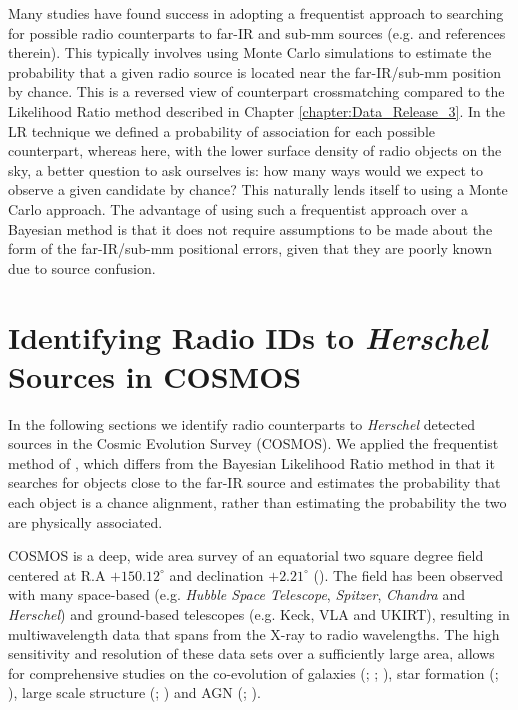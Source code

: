 Many studies have found success in adopting a frequentist approach to searching for possible radio counterparts to far-IR and sub-mm sources (e.g. \citealt{Eales_2009, Dye_2009, Dunlop_2010} and references therein). This typically involves using Monte Carlo simulations to estimate the probability that a given radio source is located near the far-IR/sub-mm position by chance. This is a reversed view of counterpart crossmatching compared to the Likelihood Ratio method described in Chapter \ref{chapter:Data_Release_3}. In the LR technique we defined a probability of association for each possible counterpart, whereas here, with the lower surface density of radio objects on the sky, a better question to ask ourselves is: how many ways would we expect to observe a given candidate by chance? This naturally lends itself to using a Monte Carlo approach. The advantage of using such a frequentist approach over a Bayesian method is that it does not require assumptions to be made about the form of the far-IR/sub-mm positional errors, given that they are poorly known due to source confusion.

\section{Identifying Radio IDs to \textit{Herschel} Sources in COSMOS}

In the following sections we identify radio counterparts to \textit{Herschel} detected sources in the Cosmic Evolution Survey (COSMOS). We applied the frequentist method of \citealt{Lilly_1999}, which differs from the Bayesian Likelihood Ratio method in that it searches for objects close to the far-IR source and estimates the probability that each object is a chance alignment, rather than estimating the probability the two are physically associated.

COSMOS is a deep, wide area survey of an equatorial two square degree field centered at R.A $+150.12^{\circ}$ and declination $+2.21^{\circ}$ (\citealt{Scoville_2007}). The field has been observed with many space-based (e.g. \textit{Hubble Space Telescope}, \textit{Spitzer}, \textit{Chandra} and \textit{Herschel}) and ground-based telescopes (e.g. Keck, VLA and UKIRT), resulting in multiwavelength data that spans from the X-ray to radio wavelengths. The high sensitivity and resolution of these data sets over a sufficiently large area, allows for comprehensive studies on the co-evolution of galaxies (\citealt{Schreiber_2018}; \citealt{Stockmann_2020}; \citealt{Valentino_2020a}), star formation (\citealt{Gruppioni_2013}; \citealt{Novak_2017}), large scale structure (\citealt{Scoville_2013}; \citealt{Laigle_2018}) and AGN (\citealt{Prescott_2006}; \citealt{Heintz_2016}). 

